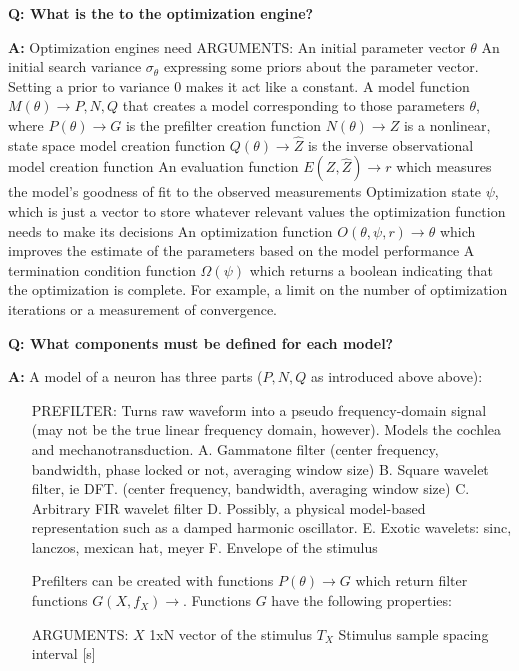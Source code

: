 \documentclass{article}
\newenvironment{qanda}{\setlength{\parindent}{0pt}}{\bigskip}
\newcommand{\Q}{\bigskip\bfseries Q: }
\newcommand{\A}{\par\textbf{A:} \normalfont}
\begin{document}
\begin{qanda}
\Q What is the to the optimization engine?
\A Optimization engines need
   ARGUMENTS:
       An initial parameter vector $\theta$
       An initial search variance $\sigma_{\theta}$ expressing some priors about the parameter vector. Setting a prior to variance 0 makes it act like a constant.
       A model function $M(\theta) \rightarrow {P, N, Q}$ that creates a model corresponding to those parameters $\theta$, where
          $P(\theta) \rightarrow G$ is the prefilter creation function 
          $N(\theta) \rightarrow Z$ is a nonlinear, state space model creation function
          $Q(\theta) \rightarrow \hat{Z}$ is the inverse observational model creation function
       An evaluation function $E(Z,\hat{Z}) \rightarrow r$ which measures the model's goodness of fit to the observed measurements
       Optimization state $\psi$, which is just a vector to store whatever relevant values the optimization function needs to make its decisions
       An optimization function $O(\theta, \psi, r) \rightarrow \theta$ which improves the estimate of the parameters based on the model performance
       A termination condition function $\Omega(\psi)$ which returns a boolean indicating that the optimization is complete. For example, a limit on the number of optimization iterations or a measurement of convergence. 

\Q What components must be defined for each model?
\A A model of a neuron has three parts ($P,N,Q$ as introduced above above): \begin{enumerate}

  \item[PREFILTER:] Turns raw waveform into a pseudo frequency-domain signal (may not be the true linear frequency domain, however). Models the cochlea and mechanotransduction.
      A. Gammatone filter (center frequency, bandwidth, phase locked or not, averaging window size)
      B. Square wavelet filter, ie DFT. (center frequency, bandwidth, averaging window size)
      C. Arbitrary FIR wavelet filter
      D. Possibly, a physical model-based representation such as a damped harmonic oscillator.
      E. Exotic wavelets: sinc, lanczos, mexican hat, meyer
      F. Envelope of the stimulus

      Prefilters can be created with functions $P(\theta) \rightarrow G$ which return filter functions $G(X,f_X) \rightarrow $. Functions $G$ have the following properties:

       ARGUMENTS:
           $X$    1xN vector of the stimulus
           $T_X$  Stimulus sample spacing interval [s]
        

\end{enumerate}
\end{qanda}
\end{document}
